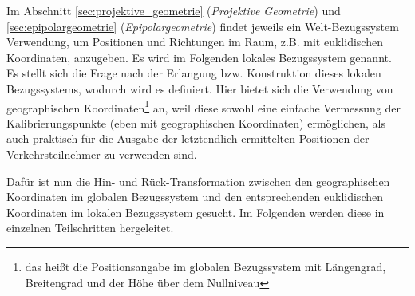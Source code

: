 Im Abschnitt \ref{sec:projektive_geometrie} (\emph{Projektive Geometrie}) und \ref{sec:epipolargeometrie} (\emph{Epipolargeometrie}) findet jeweils ein Welt-Bezugssystem Verwendung, um Positionen und Richtungen im Raum, z.B. mit euklidischen Koordinaten, anzugeben. Es wird im Folgenden lokales Bezugssystem genannt.\\
Es stellt sich die Frage nach der Erlangung bzw. Konstruktion dieses lokalen Bezugssystems, wodurch wird es definiert.
Hier bietet sich die Verwendung von geographischen Koordinaten\footnote{das heißt die Positionsangabe im globalen Bezugssystem mit Längengrad, Breitengrad und der Höhe über dem Nullniveau} an, weil diese sowohl eine einfache Vermessung der Kalibrierungspunkte (eben mit geographischen Koordinaten) ermöglichen, als auch praktisch für die Ausgabe der letztendlich ermittelten Positionen der Verkehrsteilnehmer zu verwenden sind.\kleinerabstand

\noindent Dafür ist nun die Hin- und Rück-Transformation zwischen den geographischen Koordinaten im globalen Bezugssystem und den entsprechenden euklidischen Koordinaten im lokalen Bezugssystem gesucht. Im Folgenden werden diese in einzelnen Teilschritten hergeleitet.\kleinerabstand
